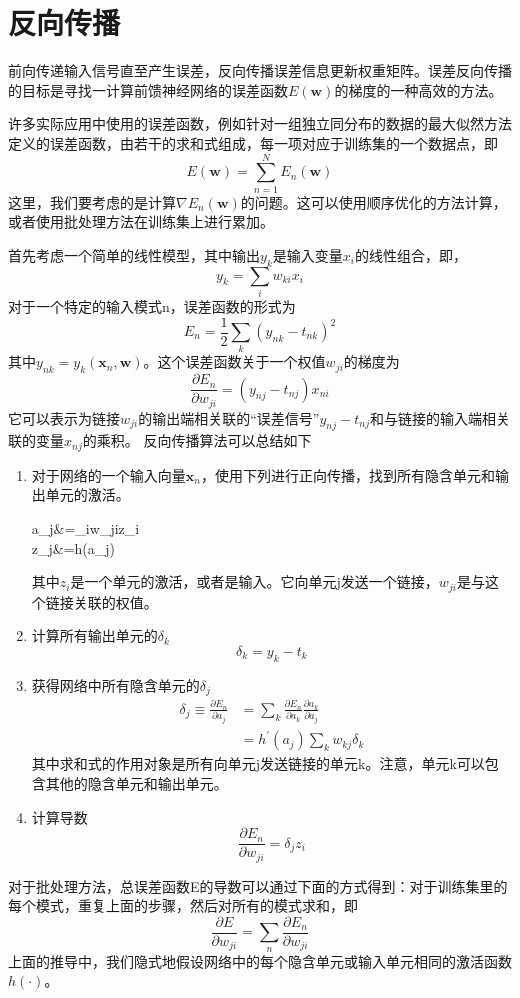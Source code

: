 \section{反向传播}
前向传递输入信号直至产生误差，反向传播误差信息更新权重矩阵。误差反向传播的目标是寻找一计算前馈神经网络的误差函数$E(\boldsymbol{w})$的梯度的一种高效的方法。

许多实际应用中使用的误差函数，例如针对一组独立同分布的数据的最大似然方法定义的误差函数，由若干的求和式组成，每一项对应于训练集的一个数据点，即
\begin{equation}
E(\boldsymbol{w})=\sum_{n=1}^{N}E_n(\boldsymbol{w})
\end{equation}
这里，我们要考虑的是计算$\nabla E_n(\boldsymbol{w})$的问题。这可以使用顺序优化的方法计算，或者使用批处理方法在训练集上进行累加。

首先考虑一个简单的线性模型，其中输出$y_k$是输入变量$x_i$的线性组合，即，
\begin{equation}
y_k=\sum_i w_{ki}x_i
\end{equation}
对于一个特定的输入模式n，误差函数的形式为
\begin{equation}
E_n=\frac{1}{2}\sum_k(y_{nk}-t_{nk})^2
\end{equation}
其中$y_{nk}=y_k(\boldsymbol{x}_n,\boldsymbol{w})$。这个误差函数关于一个权值$w_{ji}$的梯度为
\begin{equation}
\frac{\partial E_n}{\partial w_{ji}}=(y_{nj}-t_{nj})x_{ni}
\end{equation}
它可以表示为链接$w_{ji}$的输出端相关联的“误差信号”$y_{nj}-t_{nj}$和与链接的输入端相关联的变量$x_{nj}$的乘积。
反向传播算法可以总结如下 
\begin{enumerate}
	\item 对于网络的一个输入向量$\boldsymbol{x}_n$，使用下列进行正向传播，找到所有隐含单元和输出单元的激活。
	\begin{flalign}
	a_j&=\sum_iw_{ji}z_i\\
	z_j&=h(a_j)
	\end{flalign}
	其中$z_i$是一个单元的激活，或者是输入。它向单元j发送一个链接，$w_{ji}$是与这个链接关联的权值。
	\item 计算所有输出单元的$\delta_k$
	\begin{equation}
	\delta_k=y_k-t_k
	\end{equation}
	\item 获得网络中所有隐含单元的$\delta_j$
	\begin{equation}
	\begin{aligned}
	\delta_j\equiv \frac{\partial E_n}{\partial a_j}&=\sum_k \frac{\partial E_n}{\partial a_k}\frac{\partial a_k}{\partial a_j}\\
	&=h^{'}(a_j)\sum_k w_{kj}\delta_k
	\end{aligned}
	\end{equation}
	其中求和式的作用对象是所有向单元j发送链接的单元k。注意，单元k可以包含其他的隐含单元和输出单元。
	\item 计算导数
	\begin{equation}
	\frac{\partial E_n}{\partial w_{ji}}=\delta_jz_i
	\end{equation}
\end{enumerate}
对于批处理方法，总误差函数E的导数可以通过下面的方式得到：对于训练集里的每个模式，重复上面的步骤，然后对所有的模式求和，即
\begin{equation}
\frac{\partial E}{\partial w_{ji}}=\sum_{n}\frac{\partial E_n}{\partial w_{ji}}
\end{equation}
上面的推导中，我们隐式地假设网络中的每个隐含单元或输入单元相同的激活函数$h(\cdot)$。